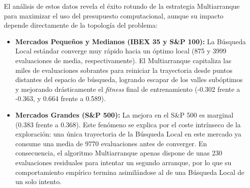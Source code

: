 \begin{table}[h]
\centering
{}
\caption{Comparativa global de las variantes de Búsqueda Local.}
\end{table}

El análisis de estos datos revela el éxito rotundo de la estrategia Multiarranque para maximizar el uso del presupuesto computacional, aunque su impacto depende directamente de la topología del problema:

\begin{itemize}
    \item \textbf{Mercados Pequeños y Medianos (IBEX 35 y S\&P 100):} La Búsqueda Local estándar converge muy rápido hacia un óptimo local (875 y 3999 evaluaciones de media, respectivamente). El Multiarranque capitaliza las miles de evaluaciones sobrantes para reiniciar la trayectoria desde puntos distantes del espacio de búsqueda, logrando escapar de los valles subóptimos y mejorando drásticamente el \textit{fitness} final de entrenamiento (-0.302 frente a -0.363, y 0.664 frente a 0.589).
    \item \textbf{Mercados Grandes (S\&P 500):} La mejora en el S\&P 500 es marginal (0.383 frente a 0.368). Este fenómeno se explica por el coste intrínseco de la exploración: una única trayectoria de la Búsqueda Local en este mercado ya consume una media de 9770 evaluaciones antes de converger. En consecuencia, el algoritmo Multiarranque apenas dispone de unas 230 evaluaciones residuales para intentar un segundo arranque, por lo que su comportamiento empírico termina asimilándose al de una Búsqueda Local de un solo intento.
\end{itemize}

